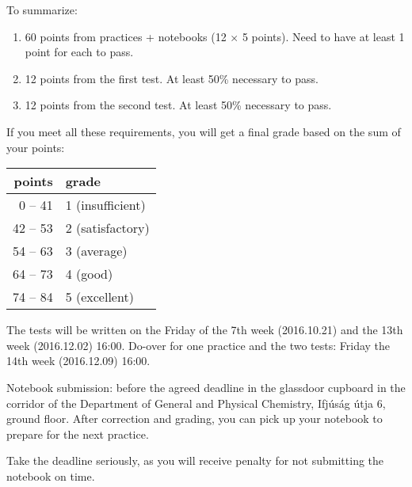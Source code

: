 \documentclass{article}
\begin{document}
To summarize: 

\begin{enumerate}
\item 60 points from practices + notebooks (12 $\times$ 5 points). Need to have at least 1 point for each to pass.
\item 12 points from the first test. At least 50\% necessary to pass.
\item 12 points from the second test. At least 50\% necessary to pass. 
\end{enumerate}

If you meet all these requirements, you will get a final grade based on the sum of your points:

\begin{center}
\begin{tabular}{|r|l|}
\hline
points & grade \\
\hline
0 -- 41 & 1 (insufficient) \\
\hline
42 -- 53 & 2 (satisfactory) \\
\hline
54 -- 63 & 3 (average) \\
\hline
64 -- 73 & 4 (good) \\
\hline
74 -- 84 & 5 (excellent) \\
\hline
\end{tabular}
\end{center}

The tests will be written on the Friday of the 7th week (2016.10.21) and the 13th week (2016.12.02) 16:00. Do-over for one practice and the two tests: Friday the 14th week (2016.12.09) 16:00. 

Notebook submission: before the agreed deadline in the glassdoor cupboard in the corridor of the Department of General and Physical Chemistry, Ifjúság útja 6, ground floor. After correction and grading, you can pick up your notebook to prepare for the next practice.

Take the deadline seriously, as you will receive penalty for not submitting the notebook on time.
\end{document}
